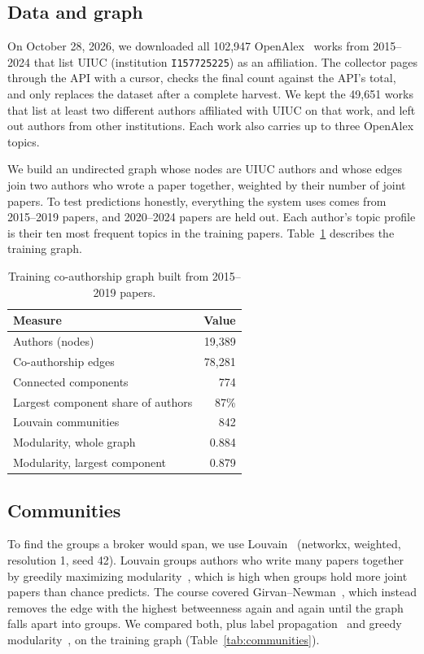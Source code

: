 \documentclass[sigconf,nonacm]{acmart}
\begin{document}
\subsection{Data and graph}
On October 28, 2026, we downloaded all 102,947 OpenAlex~\cite{openalex} works from 2015--2024 that list UIUC (institution \texttt{I157725225}) as an affiliation. The collector pages through the API with a cursor, checks the final count against the API's total, and only replaces the dataset after a complete harvest. We kept the 49,651 works that list at least two different authors affiliated with UIUC on that work, and left out authors from other institutions. Each work also carries up to three OpenAlex topics.

We build an undirected graph whose nodes are UIUC authors and whose edges join two authors who wrote a paper together, weighted by their number of joint papers. To test predictions honestly, everything the system uses comes from 2015--2019 papers, and 2020--2024 papers are held out. Each author's topic profile is their ten most frequent topics in the training papers. Table~\ref{tab:network} describes the training graph.

\begin{table}[t]
\caption{Training co-authorship graph built from 2015--2019 papers.}
\label{tab:network}
\small
\begin{tabular}{@{}lr@{}}
\toprule
Measure & Value\\
\midrule
Authors (nodes) & 19,389\\
Co-authorship edges & 78,281\\
Connected components & 774\\
Largest component share of authors & 87\%\\
Louvain communities & 842\\
Modularity, whole graph & 0.884\\
Modularity, largest component & 0.879\\
\bottomrule
\end{tabular}
\end{table}

\subsection{Communities}\label{sec:communities}
To find the groups a broker would span, we use Louvain~\cite{blondel2008} (networkx, weighted, resolution 1, seed 42). Louvain groups authors who write many papers together by greedily maximizing modularity~\cite{newman2004}, which is high when groups hold more joint papers than chance predicts. The course covered Girvan--Newman~\cite{girvan2002,easley2010}, which instead removes the edge with the highest betweenness again and again until the graph falls apart into groups. We compared both, plus label propagation~\cite{raghavan2007} and greedy modularity~\cite{clauset2004}, on the training graph (Table~\ref{tab:communities}).
\end{document}
